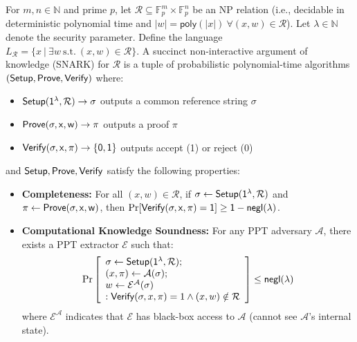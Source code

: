 \begin{definition}\label{def:snark}
    \noindent For $m, n \in \mathbb{N}$ and prime $p$, let $\mathcal{R} \subseteq \mathbb{F}_p^{m} \times \mathbb{F}_p^{n}$ be an NP relation (i.e., decidable in deterministic polynomial time and $|w| = \mathsf{poly}(|x|)\ \forall (x, w) \in \mathcal{R}$). Let $\lambda \in \mathbb{N}$ denote the security parameter. Define the language $L_\mathcal{R} = \{x\ |\ \exists w\ \text{s.t.}\ (x, w) \in \mathcal{R}\}$. A succinct non-interactive argument of knowledge (SNARK) for $\mathcal{R}$ is a tuple of probabilistic polynomial-time algorithms $(\sf{Setup}, \sf{Prove}, \sf{Verify})$ where:
\begin{itemize}
    \item $\sf{Setup}(1^{\lambda}, \mathcal{R}) \rightarrow \sigma$ outputs a common reference string $\sigma$
    \item $\sf{Prove}(\sigma, x, w) \rightarrow \pi$ outputs a proof $\pi$
    \item $\sf{Verify}(\sigma, x, \pi) \rightarrow \{0, 1\}$ outputs accept (1) or reject (0)
\end{itemize}

\noindent and $\sf{Setup}, \sf{Prove}, \sf{Verify}$ satisfy the following properties:
\begin{itemize}
    \item \textbf{Completeness:} For all $(x, w) \in \mathcal{R}$, if $\sigma \leftarrow \sf{Setup}(1^{\lambda}, \mathcal{R})$ and $\pi \leftarrow \sf{Prove}(\sigma, x, w)$, then $\Pr[\sf{Verify}(\sigma, x, \pi) = 1] \geq 1 - \mathsf{negl}(\lambda)$.
    
    \item \textbf{Computational Knowledge Soundness:} For any PPT adversary $\mathcal{A}$, there exists a PPT extractor $\mathcal{E}$ such that:
    \begin{align*}
    \Pr\left[\begin{array}{l}
    \sigma \leftarrow \sf{Setup}(1^{\lambda}, \mathcal{R}); \\
    (x, \pi) \leftarrow \mathcal{A}(\sigma); \\
    w \leftarrow \mathcal{E}^{\mathcal{A}}(\sigma) \\
    : \mathsf{Verify}(\sigma, x, \pi) = 1 \land (x, w) \notin \mathcal{R}
    \end{array}\right] \leq \mathsf{negl}(\lambda)
    \end{align*}
        where $\mathcal{E}^{\mathcal{A}}$ indicates that $\mathcal{E}$ has black-box access to $\mathcal{A}$ (cannot see $\mathcal{A}$'s internal state).
    

\end{itemize}
\end{definition}
